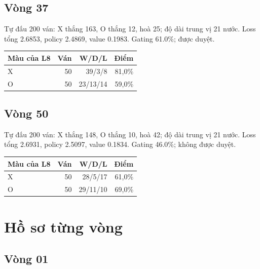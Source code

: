 \subsection{Vòng 37}

Tự đấu 200 ván: X thắng 163, O thắng 12, hoà 25; độ dài trung vị 21 nước. Loss tổng 2.6853, policy 2.4869, value 0.1983. Gating 61.0\%; được duyệt.

\begin{center}\small\begin{tabular}{@{}lrrr@{}}\toprule

Màu của L8 & Ván & W/D/L & Điểm \\

\midrule

X & 50 & 39/3/8 & 81,0\% \\

O & 50 & 23/13/14 & 59,0\% \\

\bottomrule\end{tabular}\end{center}

\subsection{Vòng 50}

Tự đấu 200 ván: X thắng 148, O thắng 10, hoà 42; độ dài trung vị 21 nước. Loss tổng 2.6931, policy 2.5097, value 0.1834. Gating 46.0\%; không được duyệt.

\begin{center}\small\begin{tabular}{@{}lrrr@{}}\toprule

Màu của L8 & Ván & W/D/L & Điểm \\

\midrule

X & 50 & 28/5/17 & 61,0\% \\

O & 50 & 29/11/10 & 69,0\% \\

\bottomrule\end{tabular}\end{center}

\section{Hồ sơ từng vòng}

\subsection*{Vòng 01}

